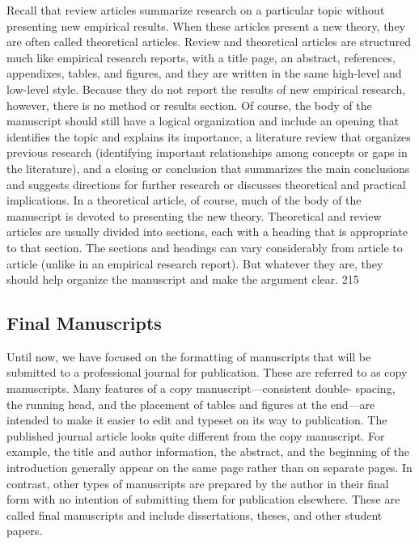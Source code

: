 Recall that review articles summarize research on a particular topic without presenting new empirical results. When these articles present a new theory, they are often called theoretical articles. Review and theoretical articles are structured much like empirical research reports, with a title page, an abstract, references, appendixes, tables, and figures, and they are written in the same high-level and low-level style. Because they do not report the results of new empirical research, however, there is no method or results section. Of course, the body of the manuscript should still have a logical organization and include an opening that identifies the topic and explains its importance, a literature review that organizes previous research (identifying important relationships among concepts or gaps in the literature), and a closing or conclusion that summarizes the main conclusions and suggests directions for further research or discusses theoretical and practical implications. In a theoretical article, of course, much of the body of the manuscript is devoted to presenting the new theory. Theoretical and review articles are usually divided into sections, each with a heading that is appropriate to that section. The sections and headings can vary considerably from article to article (unlike in an empirical research report). But whatever they are, they should help organize the manuscript and make the argument clear.
215


\subsection{Final Manuscripts}

Until now, we have focused on the formatting of manuscripts that will be submitted to a professional journal for publication. These are referred to as copy manuscripts. Many features of a copy manuscript---consistent double- spacing, the running head, and the placement of tables and figures at the end---are intended to make it easier to edit and typeset on its way to publication. The published journal article looks quite different from the copy manuscript. For example, the title and author information, the abstract, and the beginning of the introduction generally appear on the same page rather than on separate pages. In contrast, other types of manuscripts are prepared by the author in their final form with no intention of submitting them for publication elsewhere. These are called final manuscripts and include dissertations, theses, and other student papers.


